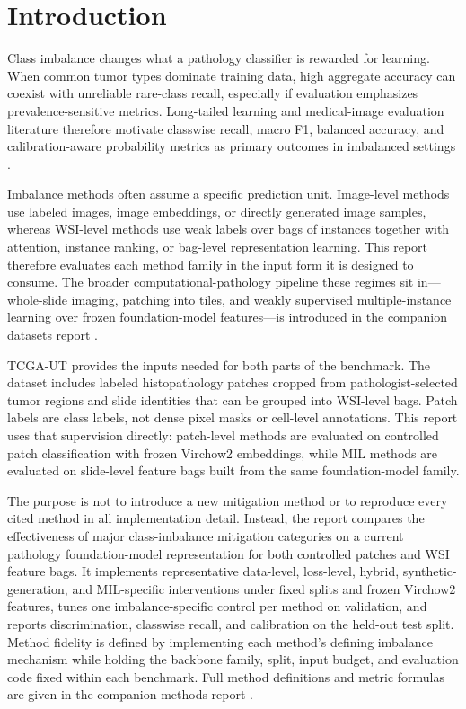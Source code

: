 \documentclass[11pt]{article}
\begin{document}
\section{Introduction}
Class imbalance changes what a pathology classifier is rewarded for learning. When common tumor types dominate training data, high aggregate accuracy can coexist with unreliable rare-class recall, especially if evaluation emphasizes prevalence-sensitive metrics. Long-tailed learning and medical-image evaluation literature therefore motivate classwise recall, macro F1, balanced accuracy, and calibration-aware probability metrics as primary outcomes in imbalanced settings \citep{saini2023tacklingClass,zhang2023deepLong,mosquera2024classImbalance}.

Imbalance methods often assume a specific prediction unit. Image-level methods use labeled images, image embeddings, or directly generated image samples, whereas WSI-level methods use weak labels over bags of instances together with attention, instance ranking, or bag-level representation learning. This report therefore evaluates each method family in the input form it is designed to consume. The broader computational-pathology pipeline these regimes sit in---whole-slide imaging, patching into tiles, and weakly supervised multiple-instance learning over frozen foundation-model features---is introduced in the companion datasets report \citep{queisler2026datasets}.

TCGA-UT provides the inputs needed for both parts of the benchmark. The dataset includes labeled histopathology patches cropped from pathologist-selected tumor regions and slide identities that can be grouped into WSI-level bags. Patch labels are class labels, not dense pixel masks or cell-level annotations. This report uses that supervision directly: patch-level methods are evaluated on controlled patch classification with frozen Virchow2 embeddings, while MIL methods are evaluated on slide-level feature bags built from the same foundation-model family.

The purpose is not to introduce a new mitigation method or to reproduce every cited method in all implementation detail. Instead, the report compares the effectiveness of major class-imbalance mitigation categories on a current pathology foundation-model representation for both controlled patches and WSI feature bags. It implements representative data-level, loss-level, hybrid, synthetic-generation, and MIL-specific interventions under fixed splits and frozen Virchow2 features, tunes one imbalance-specific control per method on validation, and reports discrimination, classwise recall, and calibration on the held-out test split. Method fidelity is defined by implementing each method's defining imbalance mechanism while holding the backbone family, split, input budget, and evaluation code fixed within each benchmark. Full method definitions and metric formulas are given in the companion methods report \citep{queisler2026imbalanceMethods}.
\end{document}
